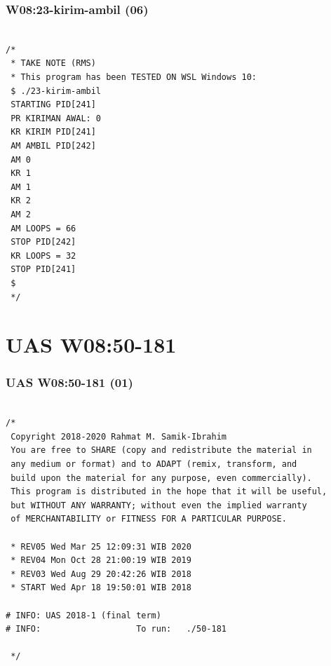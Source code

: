 \documentclass[xcolor=table, notheorems, hyperref={pdfpagelabels=false}]{beamer}
\begin{document}
\begin{frame}[fragile]
\frametitle{W08:23-kirim-ambil (06)}
\begin{lstlisting}[basicstyle=\ttfamily\small]        %  65
% \begin{lstlisting}[basicstyle=\ttfamily\large]        %  54

/*
 * TAKE NOTE (RMS)
 * This program has been TESTED ON WSL Windows 10:
 $ ./23-kirim-ambil 
 STARTING PID[241]
 PR KIRIMAN AWAL: 0
 KR KIRIM PID[241]
 AM AMBIL PID[242]
 AM 0
 KR 1
 AM 1
 KR 2
 AM 2
 AM LOOPS = 66
 STOP PID[242]
 KR LOOPS = 32
 STOP PID[241]
 $
 */

\end{lstlisting}
\end{frame}

\section{UAS W08:50-181}
\begin{frame}[fragile]
\frametitle{UAS W08:50-181 (01)}
\begin{lstlisting}[basicstyle=\ttfamily\small]        %  65
% \begin{lstlisting}[basicstyle=\ttfamily\large]        %  54

/*
 Copyright 2018-2020 Rahmat M. Samik-Ibrahim
 You are free to SHARE (copy and redistribute the material in
 any medium or format) and to ADAPT (remix, transform, and 
 build upon the material for any purpose, even commercially).
 This program is distributed in the hope that it will be useful,
 but WITHOUT ANY WARRANTY; without even the implied warranty 
 of MERCHANTABILITY or FITNESS FOR A PARTICULAR PURPOSE.

 * REV05 Wed Mar 25 12:09:31 WIB 2020
 * REV04 Mon Oct 28 21:00:19 WIB 2019
 * REV03 Wed Aug 29 20:42:26 WIB 2018
 * START Wed Apr 18 19:50:01 WIB 2018

# INFO: UAS 2018-1 (final term)
# INFO:                   To run:   ./50-181 

 */

\end{lstlisting}
\end{frame}
\end{document}
